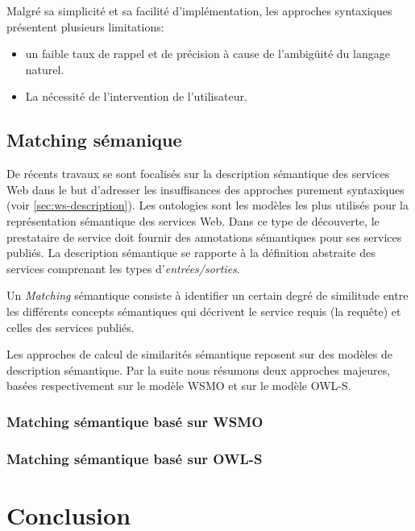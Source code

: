   Malgré sa simplicité et sa facilité d'implémentation, les approches
  syntaxiques présentent plusieurs limitations:

  \begin{itemize}
  \item un faible taux de rappel et de précision à cause de
    l'ambigüité du langage naturel.
  \item La nécessité de l'intervention de l'utilisateur.
  \end{itemize}

  \subsection{Matching sémanique}
  \label{sec:matching-semanique}
  De récents travaux se sont focalisés sur la description sémantique
  des services Web dans le but d'adresser les insuffisances des
  approches purement syntaxiques (voir \ref{sec:ws-description}). Les
  ontologies sont les modèles les plus utilisés pour la représentation
  sémantique des services Web. Dans ce type de découverte, le
  prestataire de service doit fournir des annotations sémantiques pour
  ses services publiés. La description sémantique se rapporte à la
  définition abstraite des services comprenant les types
  d'\textit{entrées/sorties}.

  Un \textit{Matching} sémantique consiste à identifier un certain
  degré de similitude entre les différents concepts sémantiques qui
  décrivent le service requis (la requête) et celles des services
  publiés.

  Les approches de calcul de similarités sémantique reposent sur des
  modèles de description sémantique. Par la suite nous résumons deux
  approches majeures, basées respectivement sur le modèle
  \textsc{WSMO} et sur le modèle \textsc{OWL-S}.

    \subsubsection{Matching sémantique basé sur WSMO}
    \label{sec:match-wsmo}
    \cite{paolucci2002semantic, keller2004wsmo}

    \subsubsection{Matching sémantique basé sur OWL-S}
    \label{sec:match-owls}
    \cite{paolucci2002semantic,benatallah2003request,
        benatallah2005automating, martin2004owl}

\newpage
\section{Conclusion}

